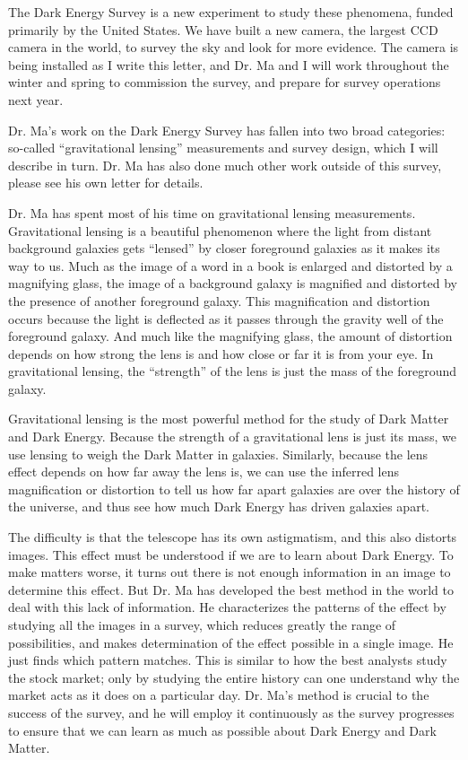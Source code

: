 \documentclass[12pt]{letter}
\begin{document}
\begin{letter}{}
The Dark Energy Survey is a new experiment to study these phenomena, funded
primarily by the United States.  We have built a new camera, the largest CCD
camera in the world, to survey the sky and look for more evidence.  The camera
is being installed as I write this letter, and Dr. Ma and I will work
throughout the winter and spring to commission the survey, and prepare for
survey operations next year.

Dr. Ma's work on the Dark Energy Survey has fallen into two broad categories:
so-called ``gravitational lensing'' measurements and survey design, which I
will describe in turn.  Dr. Ma has also done much other work outside of this
survey, please see his own letter for details.

Dr. Ma has spent most of his time on gravitational lensing measurements.
Gravitational lensing is a beautiful phenomenon where the light from distant
background galaxies gets ``lensed'' by closer foreground galaxies as it makes
its way to us.  Much as the image of a word in a book is enlarged and distorted
by a magnifying glass, the image of a background galaxy is magnified and
distorted by the presence of another foreground galaxy.  This magnification and
distortion occurs because the light is deflected as it passes through the
gravity well of the foreground galaxy.  And much like the magnifying glass, the
amount of distortion depends on how strong the lens is and how close or far it
is from your eye.  In gravitational lensing, the ``strength'' of the lens is
just the mass of the foreground galaxy.

Gravitational lensing is the most powerful method for the study of Dark Matter
and Dark Energy.  Because the strength of a gravitational lens is just its
mass, we use lensing to weigh the Dark Matter in galaxies.  Similarly, because
the lens effect depends on how far away the lens is, we can use the inferred
lens magnification or distortion to tell us how far apart galaxies are over the
history of the universe, and thus see how much Dark Energy has driven galaxies
apart.

The difficulty is that the telescope has its own astigmatism, and this also
distorts images.  This effect must be understood if we are to learn about Dark
Energy.  To make matters worse, it turns out there is not enough information in
an image to determine this effect.  But Dr. Ma has developed the best method in
the world to deal with this lack of information.  He characterizes the patterns
of the effect by studying all the images in a survey, which reduces greatly the
range of possibilities, and makes determination of the effect possible in a
single image.  He just finds which pattern matches.  This is similar to how the
best analysts study the stock market; only by studying the entire history can
one understand why the market acts as it does on a particular day.  Dr. Ma's
method is crucial to the success of the survey, and he will employ it
continuously as the survey progresses to ensure that we can learn as much as
possible about Dark Energy and Dark Matter.


\end{letter}
\end{document}
